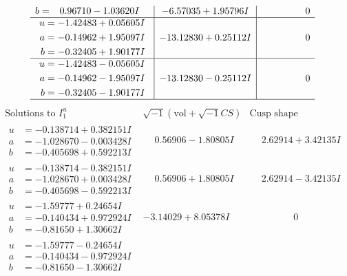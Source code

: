 \documentclass[1p]{elsarticle_modified}
\theoremstyle{definition}
\newcommand{\I}{\sqrt{-1}}
\begin{document}
$$\begin{array}{c|c|c}
\begin{aligned}
b &= \phantom{-}0.96710 - 1.03620 I\end{aligned}
 & -6.57035 + 1.95796 I & \phantom{-0.000000 } 0 \\ \hline\begin{aligned}
u &= -1.42483 + 0.05605 I \\
a &= -0.14962 + 1.95097 I \\
b &= -0.32405 + 1.90177 I\end{aligned}
 & -13.12830 + 0.25112 I & \phantom{-0.000000 } 0 \\ \hline\begin{aligned}
u &= -1.42483 - 0.05605 I \\
a &= -0.14962 - 1.95097 I \\
b &= -0.32405 - 1.90177 I\end{aligned}
 & -13.12830 - 0.25112 I & \phantom{-0.000000 } 0\\
 \hline 
 \end{array}$$\newpage$$\begin{array}{c|c|c}  
\text{Solutions to }I^u_{1}& \I (\text{vol} + \sqrt{-1}CS) & \text{Cusp shape}\\
 \hline 
\begin{aligned}
u &= -0.138714 + 0.382151 I \\
a &= -1.028670 - 0.003428 I \\
b &= -0.405698 + 0.592213 I\end{aligned}
 & \phantom{-}0.56906 - 1.80805 I & \phantom{-}2.62914 + 3.42135 I \\ \hline\begin{aligned}
u &= -0.138714 - 0.382151 I \\
a &= -1.028670 + 0.003428 I \\
b &= -0.405698 - 0.592213 I\end{aligned}
 & \phantom{-}0.56906 + 1.80805 I & \phantom{-}2.62914 - 3.42135 I \\ \hline\begin{aligned}
u &= -1.59777 + 0.24654 I \\
a &= -0.140434 + 0.972924 I \\
b &= -0.81650 + 1.30662 I\end{aligned}
 & -3.14029 + 8.05378 I & \phantom{-0.000000 } 0 \\ \hline\begin{aligned}
u &= -1.59777 - 0.24654 I \\
a &= -0.140434 - 0.972924 I \\
b &= -0.81650 - 1.30662 I\end{aligned}

\end{array}$$
\end{document}
